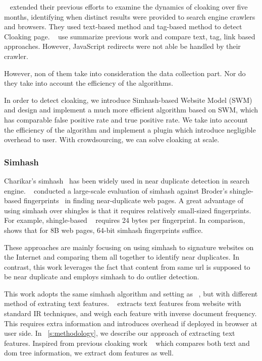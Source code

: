  ~\cite{wang2011cloak}
 extended their previous efforts to examine the dynamics of cloaking over five
 months, identifying when distinct results were provided to search engine
 crawlers and browsers.
They used text-based method and tag-based method to detect Cloaking page.
 ~\cite{deng2013uncovering} use summarize previous work and compare text, tag,
 link based approaches. However, JavaScript redirects were not able be handled by their crawler.

However, non of them take into consideration the data collection part. Nor do
they take into account the efficiency of the algorithms.

In order to detect cloaking, we introduce Simhash-based Website Model (SWM) and
design and implement a much more efficient algorithm based on SWM, which has
comparable false positive rate and true positive rate. We take into account the
efficiency of the algorithm and implement a plugin which introduce negligible
overhead to user. With crowdsourcing, we can solve cloaking at scale.


\subsubsection{Simhash}
Charikar's simhash~\cite{charikar2002similarity} has been widely used in near
duplicate detection in search engine. ~\cite{henzinger2006finding}
conducted a large-scale evaluation of simhash against Broder's shingle-based
fingerprints~\cite{broder1997syntactic} in finding near-duplicate web pages.
A great advantage of using simhash over shingles is that it
requires relatively small-sized fingerprints.
For example, shingle-based ~\cite{broder1997syntactic} requires 24 bytes per fingerprint.
In comparison, ~\cite{manku2007detecting} shows that for 8B web pages, 64-bit
simhash fingerprints suffice.

These approaches are mainly focusing on using simhash to signature websites on
the Internet and comparing them all together to identify near duplicates.
In contrast, this work leverages the fact that content from same url is supposed
to be near duplicate and employs simhash to do outlier detection.

This work adopts the same simhash algorithm and setting as 
~\cite{manku2007detecting}, but with different method of extrating text
features. ~\cite{manku2007detecting} extracts text features from website with
standard IR techniques, and weigh each feature with inverse document frequency.
This requires extra information and introduces overhead if deployed in browser at user side.
In ~\autoref{s:methodology}, we describe our approach of extracting text features.
Inspired from previous cloaking work ~\cite{wang2011cloak} which compares both
text and dom tree information, we extract dom features as well.



